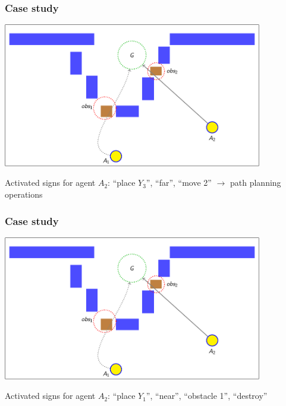 \documentclass[default]{beamer}
\begin{document}
	\begin{frame}
		\frametitle{Case study}
		
		\begin{center}
			\includegraphics[page=58,width=0.85\textwidth]{slides_colored}
		\end{center}
		\par\bigskip
		Activated signs for agent $A_2$: ``place $Y_3$'', ``far'', ``move 2'' $\rightarrow$ \color{red} path planning operations
	\end{frame}

	\begin{frame}
		\frametitle{Case study}
		
		\begin{center}
			\includegraphics[page=95,width=0.85\textwidth]{slides_colored}
		\end{center}
		\par\bigskip
		Activated signs for agent $A_2$: ``place $Y_1$'', ``near'', ``obstacle 1'', ``destroy''
	\end{frame}
\end{document}
